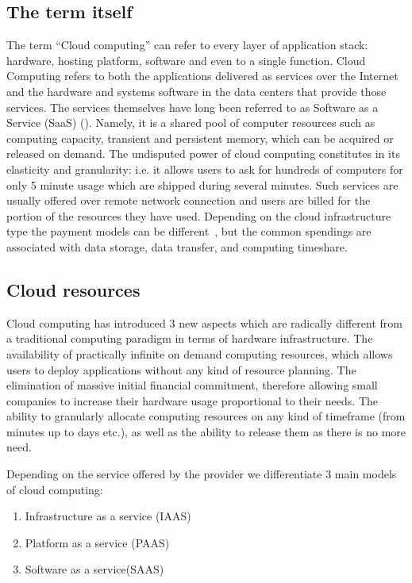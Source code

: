 \documentclass[licencjacka,en]{thesisclass}
\begin{document}
\subsection{The term itself}

The term “Cloud computing” can refer to every layer of application stack:
hardware, hosting platform, software and even to a single function.
Cloud Computing refers to both the applications delivered as services over the Internet and
the hardware and systems software in the data centers that provide those services.
The services themselves have long been referred to as Software as a Service (SaaS) (\cite{MArmbrust}).
Namely, it is a shared pool of computer resources such as computing capacity,
transient and persistent memory, which can be acquired or released on demand.
The undisputed power of cloud computing constitutes in its elasticity and granularity:
i.e. it allows users to ask for hundreds of computers for only 5 minute usage which
are shipped during several minutes.
Such services are usually offered over remote network connection and users are billed
for the portion of the resources they have used.
Depending on the cloud infrastructure type the payment models can be different~\cite{GLaatikainen},
but the common spendings are associated with data storage, data transfer, and computing timeshare.

\subsection{Cloud resources}

Cloud computing has introduced 3 new aspects which are radically different from a traditional
computing paradigm in terms of hardware infrastructure. 
The availability of practically infinite on demand computing resources,
which allows users to deploy applications without any kind of resource planning.  
The elimination of massive initial financial commitment, therefore allowing small companies to increase
their hardware usage proportional to their needs.
The ability to granularly allocate computing resources on any kind of timeframe
(from minutes up to days etc.), as well as the ability to release them as there is no more need.

Depending on the service offered by the provider we differentiate 3 main models of cloud computing:

\begin{enumerate}
    \item Infrastructure as a service (IAAS)
    \item Platform as a service (PAAS)
    \item Software as a service(SAAS)
\end{enumerate}
\end{document}
